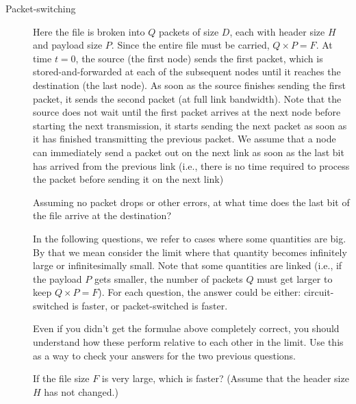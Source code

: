 \documentclass{supervision}
\begin{document}
\begin{questions}
\begin{parts}
\begin{description}
          \item[Packet-switching] Here the file is broken into $Q$ packets of
            size $D$, each with header size $H$ and payload size $P$. Since
            the entire file must be carried, $Q \times P = F$. At time
            $t = 0$, the source (the first node) sends the first packet, which
            is stored-and-forwarded at each of the subsequent nodes until it
            reaches the destination (the last node). As soon as the source
            finishes sending the first packet, it sends the second packet (at
            full link bandwidth). Note that the source does not wait until the
            first packet arrives at the next node before starting the next
            transmission, it starts sending the next packet as soon as it has
            finished transmitting the previous packet. We assume that a node
            can immediately send a packet out on the next link as soon as the
            last bit has arrived from the previous link (i.e., there is no time
            required to process the packet before sending it on the next link)

            \begin{subparts}
              \subpart Assuming no packet drops or other errors, at what time
                does the last bit of the file arrive at the destination?
            \end{subparts}

            In the following questions, we refer to cases where some quantities
            are big. By that we mean consider the limit where that quantity
            becomes infinitely large or infinitesimally small. Note that some
            quantities are linked (i.e., if the payload $P$ gets smaller, the
            number of packets $Q$ must get larger to keep $Q \times P = F$).
            For each question, the answer could be either: circuit-switched is
            faster, or packet-switched is faster.

            Even if you didn’t get the formulae above completely correct, you
            should understand how these perform relative to each other in the
            limit. Use this as a way to check your answers for the two previous
            questions.

            \begin{subparts}
              \subpart If the file size $F$ is very large, which is faster?
                (Assume that the header size $H$ has not changed.)


\end{subparts}
\end{description}
\end{parts}
\end{questions}
\end{document}
